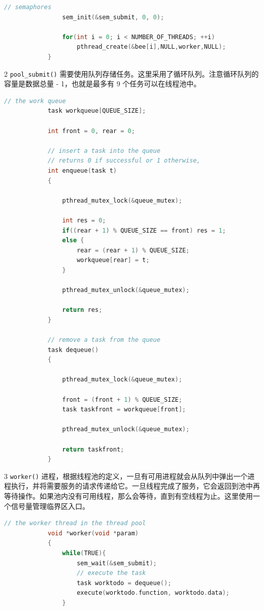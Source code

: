 \documentclass[12pt,a4paper]{article}
\newenvironment{problems}{\begin{list}{}{\renewcommand{\makelabel}[1]{\textbf{##1}\hfil}}}{\end{list}}
\newenvironment{steps}{\begin{list}{}{\renewcommand{\makelabel}[1]{##1.\hfil}}}{\end{list}}
\begin{document}
\begin{problems}
\begin{steps}
\begin{lstlisting}[language=c]
                // semaphores
                sem_init(&sem_submit, 0, 0);
            
                for(int i = 0; i < NUMBER_OF_THREADS; ++i)
                    pthread_create(&bee[i],NULL,worker,NULL);
            }
        \end{lstlisting}
        \item[2] \verb"pool_submit()" 需要使用队列存储任务。这里采用了循环队列。注意循环队列的容量是数据总量 - 1，也就是最多有 9 个任务可以在线程池中。
        \begin{lstlisting}[language=c]
            // the work queue
            task workqueue[QUEUE_SIZE];

            int front = 0, rear = 0;

            // insert a task into the queue
            // returns 0 if successful or 1 otherwise, 
            int enqueue(task t) 
            {

                pthread_mutex_lock(&queue_mutex);

                int res = 0;
                if((rear + 1) % QUEUE_SIZE == front) res = 1;
                else {
                    rear = (rear + 1) % QUEUE_SIZE;
                    workqueue[rear] = t;
                }

                pthread_mutex_unlock(&queue_mutex);
                
                return res;
            }

            // remove a task from the queue
            task dequeue() 
            {

                pthread_mutex_lock(&queue_mutex);

                front = (front + 1) % QUEUE_SIZE;
                task taskfront = workqueue[front];

                pthread_mutex_unlock(&queue_mutex);

                return taskfront;
            }
        \end{lstlisting} 
        \item[3] \verb"worker()" 进程，根据线程池的定义，一旦有可用进程就会从队列中弹出一个进程执行，并将需要服务的请求传递给它。一旦线程完成了服务，它会返回到池中再等待操作。如果池内没有可用线程，那么会等待，直到有空线程为止。这里使用一个信号量管理临界区入口。
        \begin{lstlisting}[language=c]
            // the worker thread in the thread pool
            void *worker(void *param)
            {
                while(TRUE){
                    sem_wait(&sem_submit);
                    // execute the task
                    task worktodo = dequeue();
                    execute(worktodo.function, worktodo.data);
                }


\end{lstlisting}
\end{steps}
\end{problems}
\end{document}
